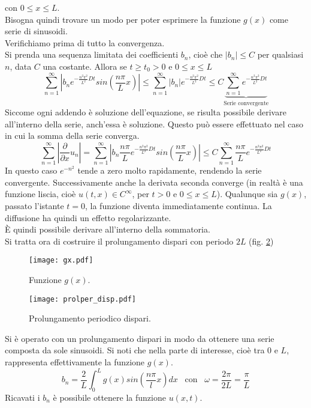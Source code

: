 con $0\leq x \leq L$.\\
Bisogna quindi trovare un modo per poter esprimere la funzione $g(x)$
come serie di sinusoidi.\\
Verifichiamo prima di tutto la convergenza.\\
Si prenda una sequenza limitata dei coefficienti $b_n$, cio\`e che
$|b_n|\leq C$ per qualsiasi $n$, data $C$ una costante. Allora se $t \geq t_0 > 0$
e $0\leq x \leq L$
\[
	\sum_{n=1}^{\infty}\left| b_n e^{-\frac{n^2\pi^2}{L^2} Dt}
	sin\left(\frac{n\pi}{L}x \right)\right|
	\leq
	\sum_{n=1}^{\infty}\left| b_n \right| e^{-\frac{n^2\pi^2}{L^2} Dt}
	\leq
	C \underbrace{\sum_{n=1}^{\infty}e^{-\frac{n^2\pi^2}{L^2} Dt}}
	_\text{Serie convergente}
\]
Siccome ogni addendo \`e soluzione dell'equazione, se risulta possibile
derivare all'interno della serie, anch'essa \`e soluzione. Questo pu\`o essere
effettuato nel caso in cui la somma della serie converga.
\[
	\sum_{n=1}^{\infty}\left| \frac{\partial}{\partial x} u_n \right|=
	\sum_{n=1}^{\infty}\left| b_n \frac{n\pi}{L} 
	e^{-\frac{n^2\pi^2}{L^2} Dt}
	sin\left(\frac{n\pi}{L}x \right)\right|
	\leq
	C \sum_{n=1}^{\infty} \frac{n\pi}{L} e^{-\frac{n^2\pi^2}{L^2} Dt}
\]
In questo caso $e^{-n^2}$ tende a zero molto rapidamente, rendendo la serie convergente. Successivamente anche la derivata seconda converge 
(in realt\`a \`e una funzione liscia, cio\`e $u(t,x)\in C^\infty$,
per $t>0$ e $0\leq x \leq L$).
Qualunque sia $g(x)$, passato l'istante $t=0$, la funzione diventa immediatamente
continua. La diffusione ha quindi un effetto regolarizzante.\\
\`E quindi possibile derivare all'interno della sommatoria.\\
Si tratta ora di costruire il prolungamento dispari con periodo $2L$ (fig. \ref{prolper_disp})
\begin{figure}[H]
	\centering
	\texttt{[image: gx.pdf]}
	\caption{Funzione $g(x)$.}
	\label{gx}
\end{figure}
\begin{figure}[H]
	\centering
	\texttt{[image: prolper\_disp.pdf]}
	\caption{Prolungamento periodico dispari.}
	\label{prolper_disp}
\end{figure}
\noindent
Si \`e operato con un prolungamento dispari in modo da ottenere una serie composta
da sole sinusoidi. Si noti che nella parte di interesse, cio\`e tra $0$ e $L$, 
rappresenta effettivamente la funzione $g(x)$.
\[
	b_n= \frac{2}{L}\int_0^L g(x)sin \left(\frac{n\pi}{l} x\right) dx
	\;\;\; \text{con} \;\;\;
	\omega= \frac{2\pi}{2L}= \frac{\pi}{L}
\]
Ricavati i $b_n$ \`e possibile ottenere la funzione $u(x,t)$.

